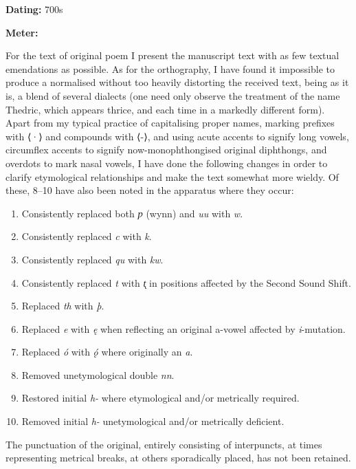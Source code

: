 
\begin{flushright}%
\textbf{Dating:} 700s

\textbf{Meter:} \Fornyrdislag%
\end{flushright}%


For the text of original poem I present the manuscript text with as few textual emendations as possible. As for the orthography, I have found it impossible to produce a normalised without too heavily distorting the received text, being as it is, a blend of several dialects (one need only observe the treatment of the name Thedric, which appears thrice, and each time in a markedly different form). Apart from my typical practice of capitalising proper names, marking prefixes with ⟨·⟩ and compounds with ⟨-⟩, and using acute accents to signify long vowels, circumflex accents to signify now-monophthongised original diphthongs, and overdots to mark nasal vowels, I have done the following changes in order to clarify etymological relationships and make the text somewhat more wieldy. Of these, 8–10 have also been noted in the apparatus where they occur:
\begin{enumerate}
  \item Consistently replaced both \emph{ƿ} (wynn) and \emph{uu} with \emph{w}.
  \item Consistently replaced \emph{c} with \emph{k}.
  \item Consistently replaced \emph{qu} with \emph{kw}.
  \item Consistently replaced \emph{t} with \emph{t̨} in positions affected by the Second Sound Shift.
  \item Replaced \emph{th} with \emph{þ}.
  \item Replaced \emph{e} with \emph{ę} when reflecting an original a-vowel affected by \emph{i}-mutation.
  \item Replaced \emph{ó} with \emph{ǫ́} where originally an \emph{a}.
  \item Removed unetymological double \emph{nn}.
  \item Restored initial \emph{h-} where etymological and/or metrically required.
  \item Removed initial \emph{h-} unetymological and/or metrically deficient.
\end{enumerate}

The punctuation of the original, entirely consisting of interpuncts, at times representing metrical breaks, at others sporadically placed, has not been retained.

